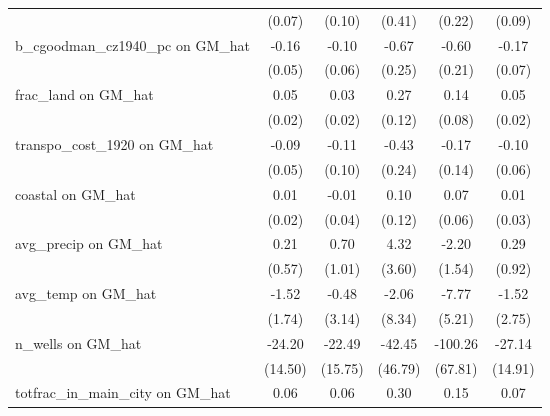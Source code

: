\begin{table}[htbp]
\begin{tabular}{l*{5}{c}}
                &   (0.07)         &   (0.10)         &   (0.41)         &   (0.22)         &   (0.09)         \\
\addlinespace
b\_cgoodman\_cz1940\_pc on GM\_hat&    -0.16\sym{***}&    -0.10         &    -0.67\sym{**} &    -0.60\sym{**} &    -0.17\sym{*}  \\
                &   (0.05)         &   (0.06)         &   (0.25)         &   (0.21)         &   (0.07)         \\
\addlinespace
frac\_land on GM\_hat&     0.05\sym{*}  &     0.03         &     0.27\sym{*}  &     0.14         &     0.05\sym{*}  \\
                &   (0.02)         &   (0.02)         &   (0.12)         &   (0.08)         &   (0.02)         \\
\addlinespace
transpo\_cost\_1920 on GM\_hat&    -0.09         &    -0.11         &    -0.43         &    -0.17         &    -0.10         \\
                &   (0.05)         &   (0.10)         &   (0.24)         &   (0.14)         &   (0.06)         \\
\addlinespace
coastal on GM\_hat&     0.01         &    -0.01         &     0.10         &     0.07         &     0.01         \\
                &   (0.02)         &   (0.04)         &   (0.12)         &   (0.06)         &   (0.03)         \\
\addlinespace
avg\_precip on GM\_hat&     0.21         &     0.70         &     4.32         &    -2.20         &     0.29         \\
                &   (0.57)         &   (1.01)         &   (3.60)         &   (1.54)         &   (0.92)         \\
\addlinespace
avg\_temp on GM\_hat&    -1.52         &    -0.48         &    -2.06         &    -7.77         &    -1.52         \\
                &   (1.74)         &   (3.14)         &   (8.34)         &   (5.21)         &   (2.75)         \\
\addlinespace
n\_wells on GM\_hat&   -24.20         &   -22.49         &   -42.45         &  -100.26         &   -27.14         \\
                &  (14.50)         &  (15.75)         &  (46.79)         &  (67.81)         &  (14.91)         \\
\addlinespace
totfrac\_in\_main\_city on GM\_hat&     0.06\sym{**} &     0.06\sym{**} &     0.30\sym{**} &     0.15\sym{*}  &     0.07\sym{***}\\

\end{tabular}
\end{table}
